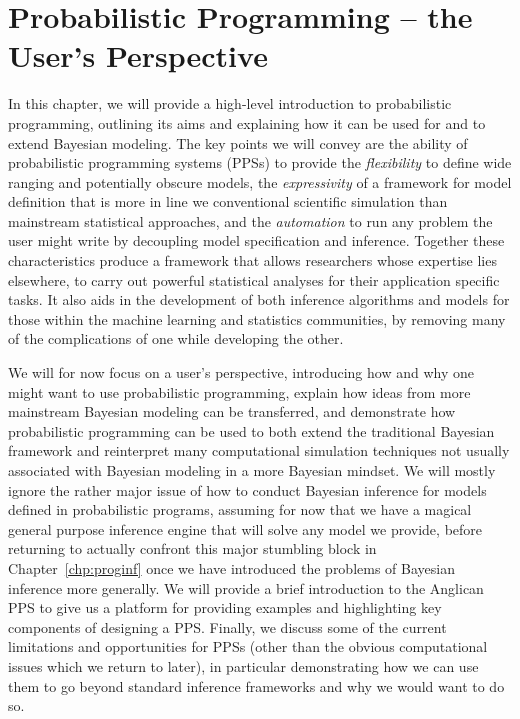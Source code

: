 
\chapter{Probabilistic Programming -- the User's Perspective}
\label{chp:probprog}

In this chapter, we will provide a high-level introduction to probabilistic programming,
outlining its aims and explaining how it can be used for and to extend Bayesian modeling.  The
key points we will convey are the ability of probabilistic programming systems (PPSs) to provide 
the \emph{flexibility} to define
wide ranging and potentially obscure models, the \emph{expressivity} of a framework for 
model definition that is more in line we conventional scientific simulation than mainstream 
statistical approaches, and the \emph{automation} to  run any problem the user might write
by decoupling model specification and inference.
Together these characteristics produce a framework that allows researchers whose expertise 
lies elsewhere, to carry out powerful statistical analyses for their application specific tasks.  
It also aids in the development of both inference
algorithms and models for those within the machine learning and statistics communities,
by removing many of the complications of one while developing the other.

We will for now focus on a user's perspective, introducing how and why one might want to use
probabilistic programming, explain how ideas from more mainstream Bayesian
modeling can be transferred, and demonstrate how probabilistic programming can be
used to both extend the traditional Bayesian framework and reinterpret many computational simulation
techniques not usually associated with Bayesian modeling in a more Bayesian mindset.
We will mostly ignore the rather major issue of how to conduct Bayesian inference for
models defined in probabilistic programs, assuming for now that we have a magical
general purpose inference engine that will solve any model we provide,
before returning to actually confront this major stumbling
block in Chapter~\ref{chp:proginf} once we have introduced the problems of Bayesian
inference more generally.  We will provide a brief introduction to the Anglican PPS
to give us a platform for providing examples and highlighting
key components of designing a PPS.  Finally, we discuss some of the current limitations
and opportunities for PPSs (other than the obvious computational
issues which we return to later), in particular demonstrating how we can use them to go beyond
standard inference frameworks and why we would want to do so.

